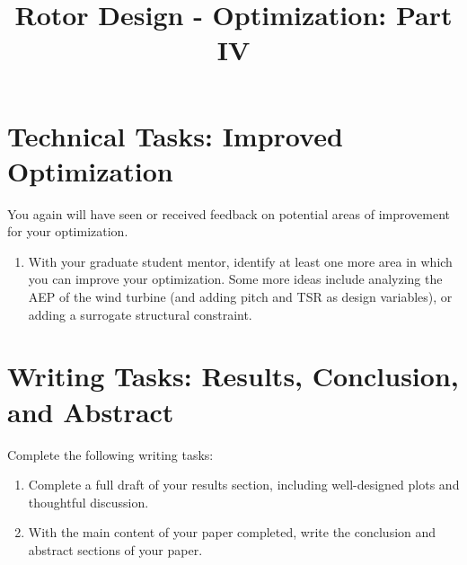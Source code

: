 \documentclass[12pt]{article}
\title{Rotor Design - Optimization: Part IV}
\date{}
\begin{document}
	
\maketitle
\vspace{-2cm}
	
	

\section{Technical Tasks: Improved Optimization}

You again will have seen or received feedback on potential areas of improvement for your optimization.

\begin{enumerate}[label=\alph*.]
	\item With your graduate student mentor, identify at least one more area in which you can improve your optimization. Some more ideas include analyzing the AEP of the wind turbine (and adding pitch and TSR as design variables), or adding a surrogate structural constraint. 
\end{enumerate}



	

\section{Writing Tasks: Results, Conclusion, and Abstract}

Complete the following writing tasks:

\begin{enumerate}[label=\alph*.]
	\item Complete a full draft of your results section, including well-designed plots and thoughtful discussion.  
	\item With the main content of your paper completed, write the conclusion and abstract sections of your paper.
\end{enumerate}


	
	
	
\end{document}
